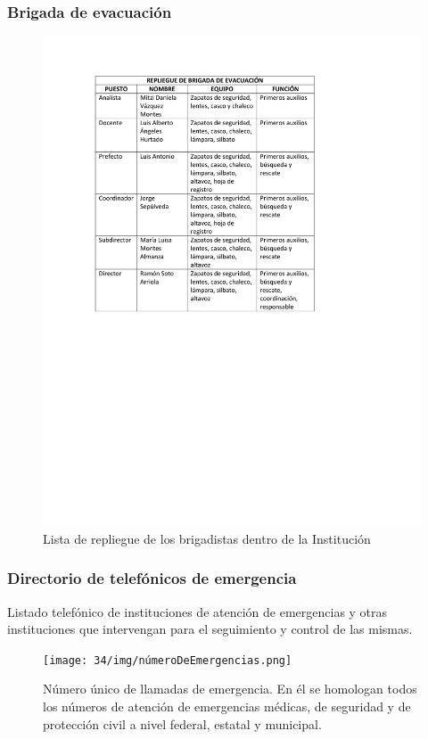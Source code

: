     \subsubsection{Brigada de evacuación}
    \begin{figure}[H]
        \centering
        \includegraphics[trim = {1mm 120mm 1mm 1mm},clip,scale=0.45]{34/img/repliegueBrigada.pdf}
        \caption{Lista de repliegue de los brigadistas dentro de la Institución}
        \label{fig:repliegueBrigada}
    \end{figure}
    \subsubsection{Directorio de telefónicos de emergencia}
    Listado telefónico de instituciones de atención de emergencias y otras instituciones que intervengan para el seguimiento y control de las mismas.
    
    \begin{figure}[H]
        \centering
        \texttt{[image: 34/img/númeroDeEmergencias.png]}
        \caption{Número único de llamadas de emergencia. En él se homologan todos los números de atención de emergencias médicas, de seguridad y de protección civil a nivel federal, estatal y municipal.}
        \label{fig:númeroDeEmergencias}
    \end{figure}
    
